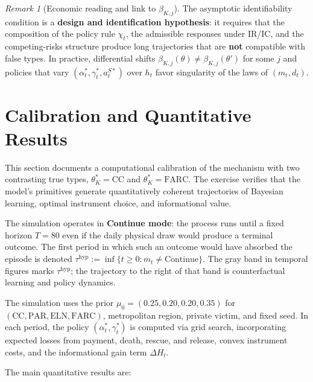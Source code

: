 \documentclass[12pt]{article}
\theoremstyle{definition}
\theoremstyle{remark}
\newtheorem{remark}[theorem]{Remark}
\newcommand{\1}{\mathbf{1}}
\begin{document}
\begin{remark}[Economic reading and link to $\beta_{K,j}$]
The asymptotic identifiability condition is a \textbf{design and identification hypothesis}: it requires that the composition of the policy rule $\chi_t$, the admissible responses under IR/IC, and the competing-risks structure produce long trajectories that are \textbf{not} compatible with false types. In practice, differential shifts $\beta_{K,j}(\theta)\neq\beta_{K,j}(\theta')$ for some $j$ and policies that vary $(\alpha_t^\ast,\gamma_t^\ast,a_t^{S\ast})$ over $h_t$ favor singularity of the laws of $(m_t,d_t)$.
\end{remark}

\section{Calibration and Quantitative Results}
\label{sec:calibration}

\noindent This section documents a computational calibration of the mechanism with two contrasting true types, $\theta_K^\ast=\mathrm{CC}$ and $\theta_K^\ast=\mathrm{FARC}$. The exercise verifies that the model's primitives generate quantitatively coherent trajectories of Bayesian learning, optimal instrument choice, and informational value.

The simulation operates in \textbf{Continue mode}: the process runs until a fixed horizon $T=80$ even if the daily physical draw would produce a terminal outcome. The first period in which such an outcome would have absorbed the episode is denoted $\tau^{\mathrm{hyp}}:=\inf\{t\ge 0:m_t\neq\mathrm{Continue}\}$. The gray band in temporal figures marks $\tau^{\mathrm{hyp}}$; the trajectory to the right of that band is counterfactual learning and policy dynamics.

The simulation uses the prior $\mu_0=(0.25,0.20,0.20,0.35)$ for $(\mathrm{CC},\mathrm{PAR},\mathrm{ELN},\mathrm{FARC})$, metropolitan region, private victim, and fixed seed. In each period, the policy $(\alpha_t^\ast,\gamma_t^\ast)$ is computed via grid search, incorporating expected losses from payment, death, rescue, and release, convex instrument costs, and the informational gain term $\Delta H_t$.

\medskip

The main quantitative results are:
\end{document}

